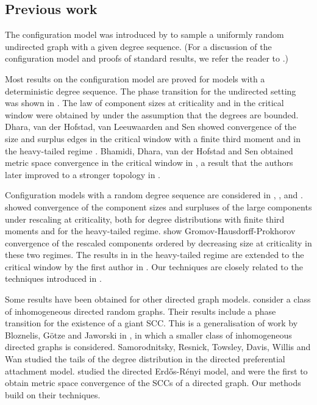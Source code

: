 \subsection{Previous work}\label{sec.previouswork}
The configuration model was introduced by \citet{Bollobas1980} to sample a uniformly random undirected graph with a given degree sequence. (For a discussion of the configuration model and proofs of standard results, we refer the reader to \cite[Chapter 7]{hofstadRandomGraphsComplex2017}.)

Most results on the configuration model are proved for models with a deterministic degree sequence. The phase transition for the undirected setting was shown in \cite{molloyCriticalPointRandom1995, Molloy1998, Janson2009}. The law of component sizes at criticality and in the critical window were obtained by \citet{Riordan2012} under the assumption that the degrees are bounded. Dhara, van der Hofstad, van Leeuwaarden and Sen showed convergence of the size and surplus edges in the critical window with a finite third moment \cite{Dhara2017} and in the heavy-tailed regime \cite{Dhara2020}.  Bhamidi, Dhara, van der Hofstad and Sen obtained metric space convergence in the critical window in \cite{Bhamidi2020}, a result that the authors later improved to a stronger topology in \cite{Bhamidi2020Glmb}. 

Configuration models with a random degree sequence are considered in \cite{josephComponentSizesCritical2014}, \cite{conchon--kerjanStableGraphMetric2020}, and \cite{Donderwinkel2021heightprocess}. \citet{josephComponentSizesCritical2014} showed convergence of the component sizes and surpluses of the large components under rescaling at criticality, both for degree distributions with finite third moments and for the heavy-tailed regime. \citet{conchon--kerjanStableGraphMetric2020} show Gromov-Hausdorff-Prokhorov convergence of the rescaled components ordered by decreasing size at criticality in these two regimes. The results in \cite{conchon--kerjanStableGraphMetric2020} in the heavy-tailed regime are extended to the critical window by the first author in \cite{Donderwinkel2021heightprocess}. Our techniques are closely related to the techniques introduced in \cite{conchon--kerjanStableGraphMetric2020}. 

Some results have been obtained for other directed graph models. \citet{caoConnectivityGeneralClass2019} consider a class of inhomogeneous directed random graphs. Their results include a phase transition for the existence of a giant SCC. This is a generalisation of work by Bloznelis, Götze and Jaworski in \cite{Bloznelis2012}, in which a smaller class of inhomogeneous directed graphs is considered. Samorodnitsky, Resnick, Towsley, Davis, Willis and Wan \cite{Samorodnitsky2016} studied the tails of the degree distribution in the directed preferential attachment model. \citet{goldschmidtScalingLimitCritical2019} studied the directed Erd\H{o}s-R\'enyi model, and were the first to obtain metric space convergence of the SCCs of a directed graph. Our methods build on their techniques.

